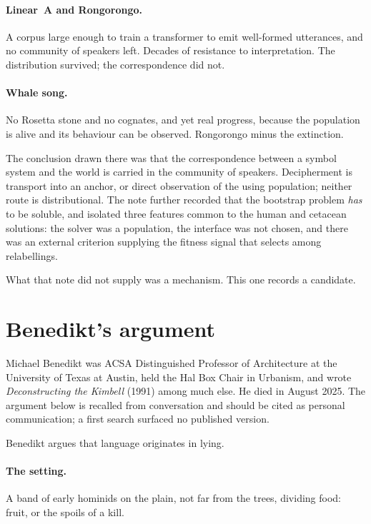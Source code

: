 \documentclass[11pt]{article}
\theoremstyle{plain}
\theoremstyle{definition}
\begin{document}
\paragraph{Linear~A and Rongorongo.} A corpus large enough to train a transformer to emit well-formed
utterances, and no community of speakers left. Decades of resistance to interpretation. The
distribution survived; the correspondence did not.

\paragraph{Whale song.} No Rosetta stone and no cognates, and yet real progress, because the population
is alive and its behaviour can be observed. Rongorongo minus the extinction.

The conclusion drawn there was that the correspondence between a symbol system and the world is carried
in the community of speakers. Decipherment is transport into an anchor, or direct observation of the
using population; neither route is distributional. The note further recorded that the bootstrap problem
\emph{has} to be soluble, and isolated three features common to the human and cetacean solutions: the
solver was a population, the interface was not chosen, and there was an external criterion supplying the
fitness signal that selects among relabellings.

What that note did not supply was a mechanism. This one records a candidate.

\section{Benedikt's argument}
\label{sec:benedikt}

Michael Benedikt was ACSA Distinguished Professor of Architecture at the University of Texas at Austin,
held the Hal Box Chair in Urbanism, and wrote \emph{Deconstructing the Kimbell} (1991) among much else.
He died in August 2025. The argument below is recalled from conversation and should be cited as personal
communication; a first search surfaced no published version.

Benedikt argues that language originates in lying.

\paragraph{The setting.} A band of early hominids on the plain, not far from the trees, dividing food:
fruit, or the spoils of a kill.
\end{document}
